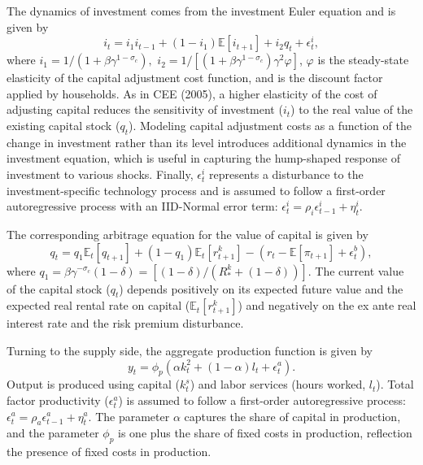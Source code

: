 \documentclass[11pt]{article}
\newcommand{\E}{\mathbb{E}}
\newcommand{\yobs}[1]{y_{#1}}
\newcommand{\iobs}[1]{i_{#1}}
\newcommand{\lobs}[1]{l_{#1}}
\newcommand{\robs}[1]{r_{#1}}
\newcommand{\piobs}[1]{\pi_{#1}}
\newcommand{\Output}{Output}
\newcommand{\investment}{investment}
\newcommand{\hours}{hours worked}
\newcommand{\realinterest}{real interest rate}
\newcommand{\labor}{labor}
\begin{document}
The dynamics of \investment{} comes from the \investment{} Euler
equation and is given by \begin{equation}
  \iobs{t} = i_1\iobs{t-1} + (1-i_1)\E[\iobs{t+1}] + i_2 q_t + \epsilon_t^i,
\end{equation} where \(i_1 = 1/(1+\beta\gamma^{1-\sigma_c}),\)
\(i_2 = 1/[(1+\beta\gamma^{1-\sigma_c})\gamma^2\varphi]\), \(\varphi\)
is the steady-state elasticity of the capital adjustment cost function,
and is the discount factor applied by households. As in CEE (2005), a
higher elasticity of the cost of adjusting capital reduces the
sensitivity of \investment{} (\(\iobs{t}\)) to the real value of the
existing capital stock (\(q_t\)). Modeling capital adjustment costs as a
function of the change in \investment{} rather than its level introduces
additional dynamics in the \investment{} equation, which is useful in
capturing the hump-shaped response of \investment{} to various shocks.
Finally, \(\epsilon^i_t\) represents a disturbance to the
\investment-specific technology process and is assumed to follow a
first-order autoregressive process with an IID-Normal error term:
\(\epsilon_t^i = \rho_i\epsilon_{t-1}^i + \eta_t^i\).

The corresponding arbitrage equation for the value of capital is given
by \begin{equation}
q_t = q_1\E_t[q_{t+1}] + (1-q_1)\E_t[r_{t+1}^k] - (\robs{t} -
\E[\piobs{t+1}] + \epsilon_t^b),
\end{equation} where
\(q_1 = \beta\gamma^{-\sigma_c}(1-\delta) = [(1-\delta)/(R_*^k + (1-\delta))]\).
The current value of the capital stock (\(q_t\)) depends positively on
its expected future value and the expected real rental rate on capital
(\(\E_t[r_{t+1}^k]\)) and negatively on the ex ante \realinterest{} and
the risk premium disturbance.

Turning to the supply side, the aggregate production function is given
by \begin{equation}
  \yobs{t} = \phi_p(\alpha k_t^2 + (1-\alpha)\lobs{t} + \epsilon_t^a).
\end{equation} \Output{} is produced using capital (\(k_t^s\)) and
\labor{} services (\hours, \(\lobs{t}\)). Total factor productivity
(\(\epsilon_t^a\)) is assumed to follow a first-order autoregressive
process: \(\epsilon_t^a = \rho_a \epsilon_{t-1}^a + \eta_t^a\). The
parameter \(\alpha\) captures the share of capital in production, and
the parameter \(\phi_p\) is one plus the share of fixed costs in
production, reflection the presence of fixed costs in production.
\end{document}
